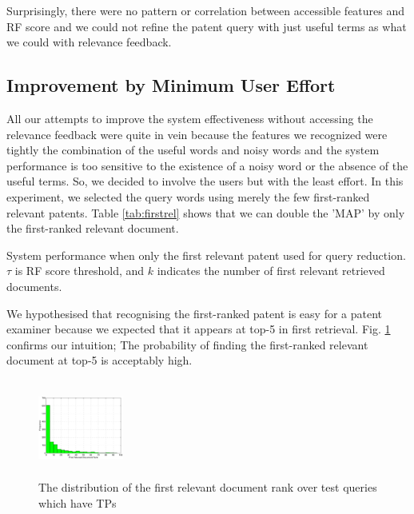 \documentclass{sig-alternate}
\begin{document}
Surprisingly, there were no pattern or correlation between accessible features and RF score and we could not refine the patent query with just useful terms as what we could with relevance feedback. 
\subsection{Improvement by Minimum User Effort}
All our attempts to improve the system effectiveness without accessing the relevance feedback were quite in vein because the features we recognized were tightly the combination of the useful words and noisy words and the system performance is too sensitive to the existence of a noisy word or the absence of the useful terms. So, we decided to involve the users but with the least effort. In this experiment, we selected the query words using merely the few first-ranked relevant patents. Table \ref{tab:firstrel} shows that we can double the 'MAP' by only the first-ranked relevant document.
\begin{table}[htpb]
  \begin{center}
   \caption{System performance when only the first relevant patent used for query reduction. $\tau$ is RF score threshold, and $k$ indicates the number of first relevant retrieved documents.}\vspace{3mm}
     
  \label{tab:firstrel}
  \end{center}  
\end{table}
 We hypothesised that recognising the first-ranked patent is easy for a patent examiner because we expected that it appears at top-5 in first retrieval. Fig. \ref{fig:FirstTPRankHisto} confirms our intuition; The probability of finding the first-ranked relevant document at top-5 is acceptably high.   
\begin{figure}[htpb]
   \centering
   \includegraphics[width=0.25\textwidth,height=32mm]{figs/FirstTPRank.eps}
   \caption{The distribution of the first relevant document rank over test queries which have TPs}   
   \label{fig:FirstTPRankHisto} 
\end{figure}
\end{document}
